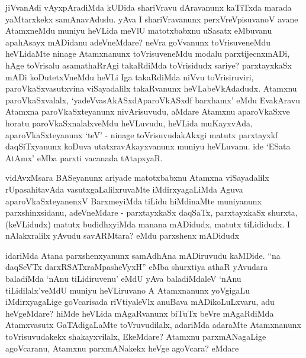 \begin{artha}
jiVvanAdi vAyxpAradiMda kUDida shariVravu dAravanunx kaTiTxda marada yaMtarxkekx samAnavAdudu. yAva I shariVravanunx perxVreVpisuvanoV avane AtamxneMdu muniyu heVLida meVlU matotxbabxnu uSasatx eMbuvanu apahAsayx mADidanu \mdash  adeVneMdare? neVra goVvanunx toVrisuveneMdu heVLidaMte ninage Atamxnanunx toVrisuveneMdu modalu parxtijecnxmADi, hAge toVrisalu asamathaRrAgi takaRdiMda toVrisidudx sariye? parxtayxkaSx mADi koDutetxVneMdu heVLi Iga takaRdiMda niVvu toVrisiruviri, paroVkaSxvasutxvina viSayadalilx takaRvanunx heVLabeVkAdadudx. Atamxnu paroVkaSxvalalx, `yadeVvasAkASxdAparoVkASxdf barxhamx' eMdu EvakAravu Atamxna paroVkaSxteyanunx nivArisuvudu, aMdare Atamxnu aparoVkaSxve horatu paroVkaSxnalalxveMdu heVLuvudu, heVLida muKayxvAda, aparoVkaSxteyanunx `teV' - ninage toVrisuvudakAkxgi matutx parxtayxkf daqSiTxyanunx koDuva utatxravAkayxvanunx muniyu heVLuvanu. ide `ESata AtAmx' eMba parxti vacanada tAtapxyaR.
\end{artha}


\begin{artha}
vidAvxMsara BASeyanunx ariyade matotxbabxnu Atamxna viSayadalilx rUpasahitavAda vasutxgaLalilxruvaMte iMdirxyagaLiMda Aguva aparoVkaSxteyanenxV BarxmeyiMda tiLidu hiMdinaMte muniyanunx parxshinxsidanu, adeVneMdare - parxtayxkaSx daqSaTx, parxtayxkaSx shurxta, (keVLidudx) matutx budidhxyiMda manana mADidudx, matutx tiLididudx. I nAlakxralilx yAvudu savARMtara? eMdu parxshenx mADidudx 
\end{artha}


\begin{artha}
idariMda Atana parxshenxyanunx samAdhAna mADiruvudu kaMDide. ``na daqSeVTx darxRSATxraMpasheVyxH'' eMba shurxtiya athaR \mdash  yAvudara baladiMda `nAnu tiLidiruvenu' eMdU yAva baladiMdaleV `nAnu tiLidilalx'veMdU muniyu heVLiruvano A Atamxnanunx yoVgigaLu iMdirxyagaLige goVcarisada riVtiyaleVlx anuBava mADikoLuLxvaru, adu heVgeMdare? hiMde heVLida mAgaRvanunx biTuTx beVre mAgaRdiMda Atamxvasutx GaTAdigaLaMte toVruvudilalx, adariMda adaraMte Atamxnanunx toVrisuvudakekx shakayxvilalx, EkeMdare? Atamxnu parxmANagaLige agoVcaranu, Atamxnu parxmANakekx heVge agoVcara? eMdare \mdash  
\end{artha}


